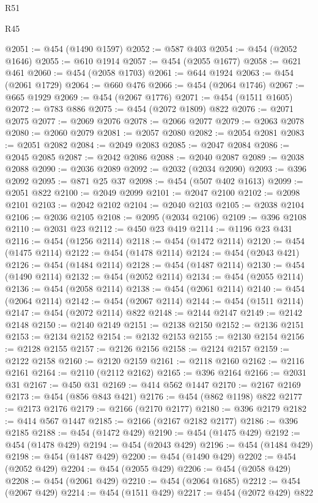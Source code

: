 \begin{lexlean}{R51}
\begin{lexlean}{R45}
\begin{coremodule}
{{{{{{{{{{{{{{{{{{{{{{{{{{{{{{{{{{{{{{{{{{{{{{{{{{{{{{{{{{{{{{{{{{{{{{{{{{{{{{{{{{{{{{{{{{{@2051 := @454 (@1490 @1597)
@2052 := @587 @403
@2054 := @454 (@2052 @1646)
@2055 := @610 @1914
@2057 := @454 (@2055 @1677)
@2058 := @621 @461
@2060 := @454 (@2058 @1703)
@2061 := @644 @1924
@2063 := @454 (@2061 @1729)
@2064 := @660 @476
@2066 := @454 (@2064 @1746)
@2067 := @665 @1929
@2069 := @454 (@2067 @1776)
@2071 := @454 (@1511 @1605)
@2072 := @783 @886
@2075 := @454 (@2072 @1809) @822
@2076 := @2071 @2075
@2077 := @2069 @2076
@2078 := @2066 @2077
@2079 := @2063 @2078
@2080 := @2060 @2079
@2081 := @2057 @2080
@2082 := @2054 @2081
@2083 := @2051 @2082
@2084 := @2049 @2083
@2085 := @2047 @2084
@2086 := @2045 @2085
@2087 := @2042 @2086
@2088 := @2040 @2087
@2089 := @2038 @2088
@2090 := @2036 @2089
@2092 := @2032 (@2034 @2090)
@2093 := @396 @2092
@2095 := @871 @25 @37
@2098 := @454 (@507 @402 @1613)
@2099 := @2051 @822
@2100 := @2049 @2099
@2101 := @2047 @2100
@2102 := @2098 @2101
@2103 := @2042 @2102
@2104 := @2040 @2103
@2105 := @2038 @2104
@2106 := @2036 @2105
@2108 := @2095 (@2034 @2106)
@2109 := @396 @2108
@2110 := @2031 @23
@2112 := @450 @23 @419
@2114 := @1196 @23 @431
@2116 := @454 (@1256 @2114)
@2118 := @454 (@1472 @2114)
@2120 := @454 (@1475 @2114)
@2122 := @454 (@1478 @2114)
@2124 := @454 (@2043 @421)
@2126 := @454 (@1484 @2114)
@2128 := @454 (@1487 @2114)
@2130 := @454 (@1490 @2114)
@2132 := @454 (@2052 @2114)
@2134 := @454 (@2055 @2114)
@2136 := @454 (@2058 @2114)
@2138 := @454 (@2061 @2114)
@2140 := @454 (@2064 @2114)
@2142 := @454 (@2067 @2114)
@2144 := @454 (@1511 @2114)
@2147 := @454 (@2072 @2114) @822
@2148 := @2144 @2147
@2149 := @2142 @2148
@2150 := @2140 @2149
@2151 := @2138 @2150
@2152 := @2136 @2151
@2153 := @2134 @2152
@2154 := @2132 @2153
@2155 := @2130 @2154
@2156 := @2128 @2155
@2157 := @2126 @2156
@2158 := @2124 @2157
@2159 := @2122 @2158
@2160 := @2120 @2159
@2161 := @2118 @2160
@2162 := @2116 @2161
@2164 := @2110 (@2112 @2162)
@2165 := @396 @2164
@2166 := @2031 @31
@2167 := @450 @31
@2169 := @414 @562 @1447
@2170 := @2167 @2169
@2173 := @454 (@856 @843 @421)
@2176 := @454 (@862 @1198) @822
@2177 := @2173 @2176
@2179 := @2166 (@2170 @2177)
@2180 := @396 @2179
@2182 := @414 @567 @1447
@2185 := @2166 (@2167 @2182 @2177)
@2186 := @396 @2185
@2188 := @454 (@1472 @429)
@2190 := @454 (@1475 @429)
@2192 := @454 (@1478 @429)
@2194 := @454 (@2043 @429)
@2196 := @454 (@1484 @429)
@2198 := @454 (@1487 @429)
@2200 := @454 (@1490 @429)
@2202 := @454 (@2052 @429)
@2204 := @454 (@2055 @429)
@2206 := @454 (@2058 @429)
@2208 := @454 (@2061 @429)
@2210 := @454 (@2064 @1685)
@2212 := @454 (@2067 @429)
@2214 := @454 (@1511 @429)
@2217 := @454 (@2072 @429) @822
}}}}}}}}}}}}}}}}}}}}}}}}}}}}}}}}}}}}}}}}}}}}}}}}}}}}}}}}}}}}}}}}}}}}}}}}}}}}}}}}}}}}}}}}}}}
\end{coremodule}
\end{lexlean}
\end{lexlean}
